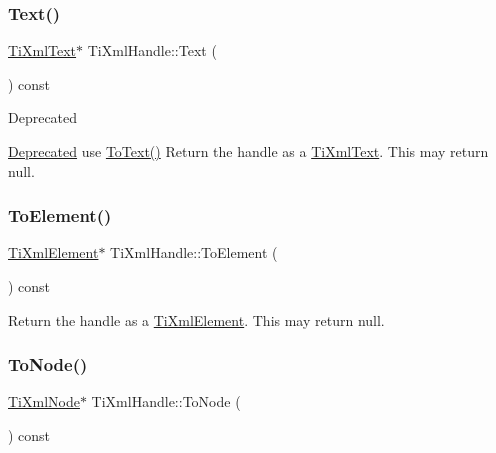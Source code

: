 \subsubsection{\texorpdfstring{Text()}{Text()}}
{\footnotesize\ttfamily \hyperlink{class_ti_xml_text}{Ti\+Xml\+Text}$\ast$ Ti\+Xml\+Handle\+::\+Text (\begin{DoxyParamCaption}{ }\end{DoxyParamCaption}) const\hspace{0.3cm}{\ttfamily [inline]}}

\begin{DoxyRefDesc}{Deprecated}
\item[\hyperlink{deprecated__deprecated000003}{Deprecated}]use \hyperlink{class_ti_xml_handle_abde286bce1d5db0d20ec30e573278cdf}{To\+Text()} Return the handle as a \hyperlink{class_ti_xml_text}{Ti\+Xml\+Text}. This may return null. \end{DoxyRefDesc}
\mbox{\label{class_ti_xml_handle_a0e3a5333550237d899b1df2b965611a1}} 
\subsubsection{\texorpdfstring{To\+Element()}{ToElement()}}
{\footnotesize\ttfamily \hyperlink{class_ti_xml_element}{Ti\+Xml\+Element}$\ast$ Ti\+Xml\+Handle\+::\+To\+Element (\begin{DoxyParamCaption}{ }\end{DoxyParamCaption}) const\hspace{0.3cm}{\ttfamily [inline]}}

Return the handle as a \hyperlink{class_ti_xml_element}{Ti\+Xml\+Element}. This may return null. \mbox{\label{class_ti_xml_handle_a0e436dea2dd869a859e3a4486023f0fa}} 
\subsubsection{\texorpdfstring{To\+Node()}{ToNode()}}
{\footnotesize\ttfamily \hyperlink{class_ti_xml_node}{Ti\+Xml\+Node}$\ast$ Ti\+Xml\+Handle\+::\+To\+Node (\begin{DoxyParamCaption}{ }\end{DoxyParamCaption}) const\hspace{0.3cm}{\ttfamily [inline]}}

